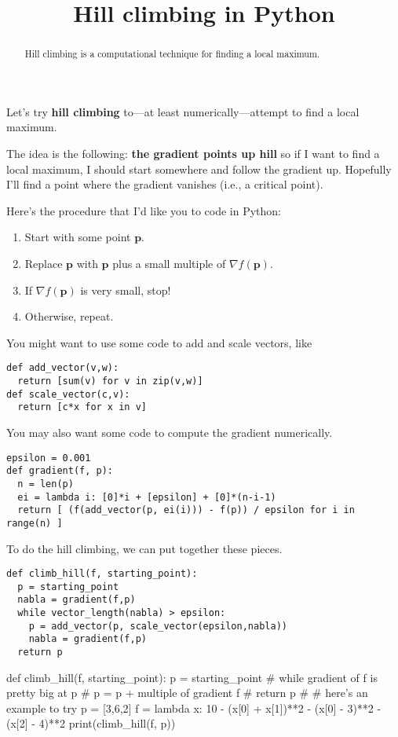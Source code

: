 \documentclass{ximera}
\title{Hill climbing in Python}
\begin{document}
\begin{abstract}
  Hill climbing is a computational technique for finding a local maximum.
\end{abstract}

Let's try \textbf{hill climbing} to---at least numerically---attempt
to find a local maximum.

The idea is the following: \textbf{the gradient points up hill} so if
I want to find a local maximum, I should start somewhere and follow
the gradient up.  Hopefully I'll find a point where the gradient
vanishes (i.e., a critical point).

\begin{question}
  Here's the procedure that I'd like you to code in Python:
  \begin{enumerate}
  \item Start with some point $\mathbf{p}$.
  \item Replace $\mathbf{p}$ with $\mathbf{p}$ plus a small multiple of $\nabla f(\mathbf{p})$.
  \item If $\nabla f(\mathbf{p})$ is very small, stop!
  \item Otherwise, repeat.
  \end{enumerate}


  \begin{solution}
    \begin{hint}
       You might want to use some code to add and scale vectors, like
\begin{verbatim}
def add_vector(v,w):
  return [sum(v) for v in zip(v,w)]
def scale_vector(c,v):
  return [c*x for x in v]
\end{verbatim}
    \end{hint}
    \begin{hint}
      You may also want some code to compute the gradient numerically.
\begin{verbatim}
epsilon = 0.001
def gradient(f, p):
  n = len(p)
  ei = lambda i: [0]*i + [epsilon] + [0]*(n-i-1)
  return [ (f(add_vector(p, ei(i))) - f(p)) / epsilon for i in range(n) ]      
\end{verbatim}
    \end{hint}
    \begin{hint}
To do the hill climbing, we can put together these pieces.
\begin{verbatim}
def climb_hill(f, starting_point):
  p = starting_point
  nabla = gradient(f,p)
  while vector_length(nabla) > epsilon:
    p = add_vector(p, scale_vector(epsilon,nabla))
    nabla = gradient(f,p)
  return p
\end{verbatim}
    \end{hint}
    \begin{python}
def climb_hill(f, starting_point):
  p = starting_point
  # while gradient of f is pretty big at p
  #   p = p + multiple of gradient f
  # return p
#
# here's an example to try
p = [3,6,2]
f = lambda x: 10 - (x[0] + x[1])**2 - (x[0] - 3)**2 - (x[2] - 4)**2
print(climb_hill(f, p))


\end{python}
\end{solution}
\end{question}
\end{document}

